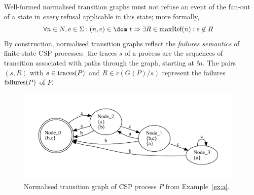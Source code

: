 Well-formed normalised transition graphs must not refuse an event of the
fan-out of a state in {\it every} refusal applicable in this state; more
formally,
\begin{equation}
\label{eq:wellformedg}
\forall n\in N, e\in\Sigma: (n,e)\in\dom~t \Rightarrow
\exists R\in \maxrefs(n): e\not\in R
\end{equation}
%
By construction, normalised transition graphs reflect the \emph{failures
semantics} of finite-state CSP processes:~the traces $s$ of a process are the
sequences of transition associated with paths through the graph,
starting at $\ii n$. The pairs $(s,R)$ with $s\in\text{traces}(P)$ and $R\in
r(G(P)/s)$ represent the failures ${\text {\rm failures}}(P)$ of $P$.

 \begin{figure}
 \begin{center}
\includegraphics[width=\textwidth]{q0.pdf}
\end{center}
\caption{Normalised transition graph of CSP process $P$ from Example~\ref{ex:a}.}
 \label{fig:tga}
 \end{figure}

